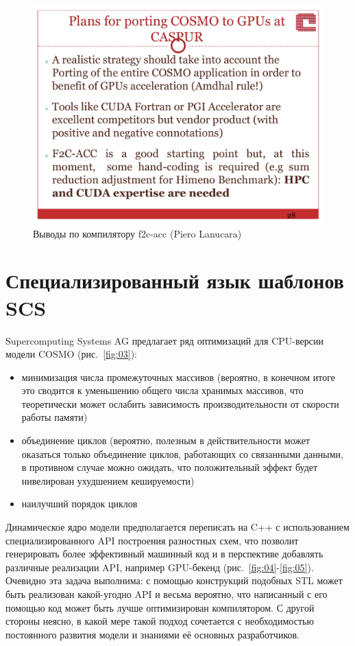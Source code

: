 \documentclass[a4,12pt]{report}
\begin{document}
\begin{figure}
\centering
\includegraphics[scale=0.4]{slides/10.pdf}
\caption{Выводы по компилятору f2c-acc (Piero Lanucara)}
\label{fig:10}
\end{figure}

\section{Специализированный язык шаблонов SCS}

Supercomputing Systems AG предлагает ряд оптимизаций для CPU-версии модели COSMO (рис.~\ref{fig:03}):

\begin{itemize}
\item минимизация числа промежуточных массивов (вероятно, в конечном итоге это сводится к уменьшению общего числа хранимых массивов, что теоретически может ослабить зависимость производительности от скорости работы памяти)
\item объединение циклов (вероятно, полезным в действительности может оказаться только объединение циклов, работающих со связанными данными, в противном случае можно ожидать, что положительный эффект будет нивелирован ухудшением кешируемости)
\item наилучший порядок циклов
\end{itemize}

Динамическое ядро модели предполагается переписать на C++ с использованием специализированного API построения разностных схем, что позволит генерировать более эффективный машинный код и в перспективе добавлять различные реализации API, например GPU-бекенд (рис.~\ref{fig:04}-\ref{fig:05}). Очевидно эта задача выполнима: с помощью конструкций подобных STL может быть реализован какой-угодно API и весьма вероятно, что написанный с его помощью код может быть лучше оптимизирован компилятором. С другой стороны неясно, в какой мере такой подход сочетается с необходимостью постоянного развития модели и знаниями её основных разработчиков.
\end{document}
